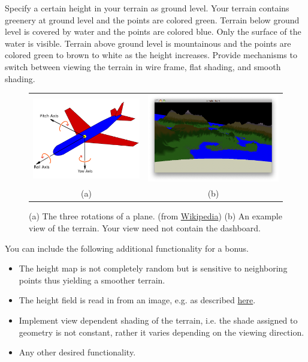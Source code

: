 \documentclass[addpoints]{exam}
\begin{document}
\begin{questions}
  Specify a certain height in your terrain as ground level. Your terrain contains greenery at ground level and the points are colored green. Terrain below ground level is covered by water and the points are colored blue. Only the surface of the water is visible. Terrain above ground level is mountainous and the points are colored green to brown to white as the height increases. Provide mechanisms to switch between viewing the terrain in wire frame, flat shading, and smooth shading.
  \begin{figure}[!h]
    \centering
    \begin{tabular}{cc}
      \includegraphics[height=.35\textwidth]{plane}
      &   \includegraphics[height=.35\textwidth]{view}\\
      (a) & (b)
    \end{tabular}
    \caption{(a) The three rotations of a plane. (from \href{https://en.wikipedia.org/wiki/Flight_dynamics_(fixed-wing_aircraft}{Wikipedia}) (b) An example view of the terrain. Your view need not contain the dashboard.}
  \end{figure}

  You can include the following additional functionality for a bonus.
  \begin{itemize}
  \item The height map is not completely random but is sensitive to neighboring points thus yielding a smoother terrain.
  \item The height field is read in from an image, e.g. as described \href{http://www.cs.cmu.edu/~jkh/462_s07/assts/assignment1/}{here}.
  \item Implement view dependent shading of the terrain, i.e. the shade assigned to geometry is not constant, rather it varies depending on the viewing direction.
  \item Any other desired functionality.
  \end{itemize}

\end{questions}
\end{document}
